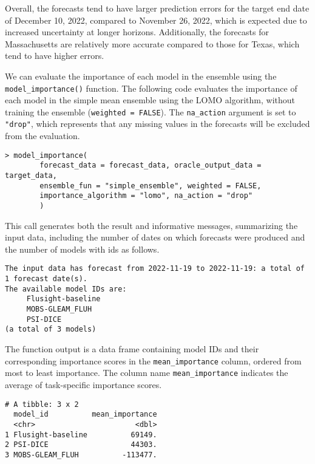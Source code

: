 \documentclass[
  article,
  shortnames,
  notitle]{jss}
\begin{document}
Overall, the forecasts tend to have larger prediction errors for the
target end date of December 10, 2022, compared to November 26, 2022,
which is expected due to increased uncertainty at longer horizons.
Additionally, the forecasts for Massachusetts are relatively more
accurate compared to those for Texas, which tend to have higher errors.

\normalsize

We can evaluate the importance of each model in the ensemble using the
\texttt{model\_importance()} function. The following code evaluates the
importance of each model in the simple mean ensemble using the LOMO
algorithm, without training the ensemble (\texttt{weighted\ =\ FALSE}).
The \texttt{na\_action} argument is set to \texttt{"drop"}, which
represents that any missing values in the forecasts will be excluded
from the evaluation.

\begin{verbatim}
> model_importance(
        forecast_data = forecast_data, oracle_output_data = target_data,
        ensemble_fun = "simple_ensemble", weighted = FALSE,
        importance_algorithm = "lomo", na_action = "drop"
        )
\end{verbatim}

This call generates both the result and informative messages,
summarizing the input data, including the number of dates on which
forecasts were produced and the number of models with ids as follows.

\small

\begin{verbatim}
The input data has forecast from 2022-11-19 to 2022-11-19: a total of 1 forecast date(s).
The available model IDs are:
     Flusight-baseline
     MOBS-GLEAM_FLUH
     PSI-DICE 
(a total of 3 models)
\end{verbatim}

\normalsize

The function output is a data frame containing model IDs and their
corresponding importance scores in the \texttt{mean\_importance} column,
ordered from most to least importance. The column name
\texttt{mean\_importance} indicates the average of task-specific
importance scores.

\small

\begin{verbatim}
# A tibble: 3 x 2
  model_id          mean_importance
  <chr>                       <dbl>
1 Flusight-baseline          69149.
2 PSI-DICE                   44303.
3 MOBS-GLEAM_FLUH          -113477.
\end{verbatim}
\end{document}
